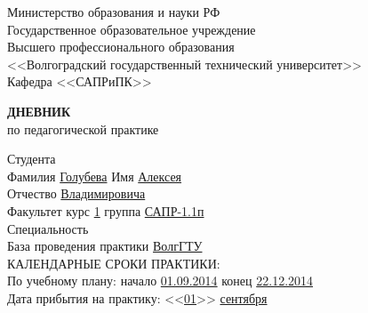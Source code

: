\documentclass[a4paper, 14pt]{extreport}
\begin{document}
    \begin{titlepage}
        \begin{center}
            Министерство образования и науки РФ \\
            Государственное образовательное учреждение\\
            Высшего профессионального образования\\
            <<Волгоградский государственный технический университет>>\\
            Кафедра <<САПРиПК>>
        \end{center}
        \vspace{2cm}
        \begin{center}
            \large \textbf{ДНЕВНИК} \\
            по педагогической практике
        \end{center}
        \begin{flushleft}
            Студента\\
            Фамилия \underline{Голубева\hspace{3.1cm}} 
            Имя \underline{Алексея\hspace{2.1cm}}\\
            Отчество \underline{Владимировича\hspace{1.6cm}}\\
            Факультет \underline{\hspace{4.8cm}} курс \underline{1\hspace{1.5cm}} 
            группа \underline{САПР-1.1п\hspace{1.9cm}}\\
            \vspace{1cm}
            Специальность \underline{\hspace{12.8cm}}\\
            База проведения практики \underline{ВолгГТУ\hspace{8.4cm}}\\
            \vspace{1cm}
            КАЛЕНДАРНЫЕ СРОКИ ПРАКТИКИ:\\
            По учебному плану: \hspace{0.2cm} начало \underline{01.09.2014\hspace{1.8cm}} 
            конец \underline{22.12.2014\hspace{1.8cm}}\\
            Дата прибытия на практику: <<\underline{01}>> \underline{сентября\hspace{1.2cm}} 

\end{flushleft}
\end{titlepage}
\end{document}
